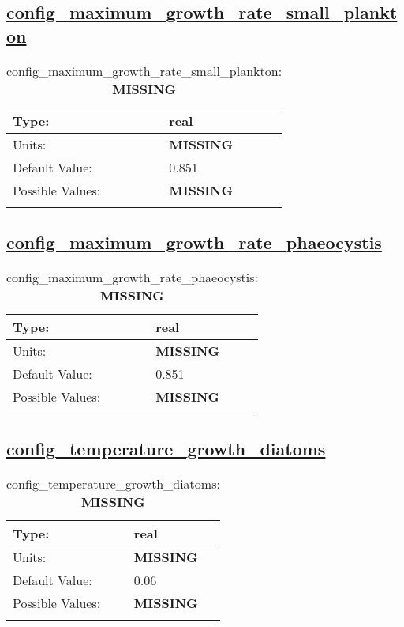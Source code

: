 \subsection[config\_maximum\_growth\_rate\_small\_plankton]{\hyperref[sec:nm_tab_biogeochemistry]{config\_maximum\_growth\_rate\_small\_plankton}}
\label{subsec:nm_sec_config_maximum_growth_rate_small_plankton}
\begin{center}
\begin{longtable}{| p{2.0in} || p{4.0in} |}
    \hline
    Type: & real \\
    \hline
    Units: & {\bf \color{red} MISSING} \\
    \hline
    Default Value: & 0.851 \\
    \hline
    Possible Values: & {\bf \color{red} MISSING} \\
    \hline
    \caption{config\_maximum\_growth\_rate\_small\_plankton: {\bf \color{red} MISSING}}
\end{longtable}
\end{center}
\subsection[config\_maximum\_growth\_rate\_phaeocystis]{\hyperref[sec:nm_tab_biogeochemistry]{config\_maximum\_growth\_rate\_phaeocystis}}
\label{subsec:nm_sec_config_maximum_growth_rate_phaeocystis}
\begin{center}
\begin{longtable}{| p{2.0in} || p{4.0in} |}
    \hline
    Type: & real \\
    \hline
    Units: & {\bf \color{red} MISSING} \\
    \hline
    Default Value: & 0.851 \\
    \hline
    Possible Values: & {\bf \color{red} MISSING} \\
    \hline
    \caption{config\_maximum\_growth\_rate\_phaeocystis: {\bf \color{red} MISSING}}
\end{longtable}
\end{center}
\subsection[config\_temperature\_growth\_diatoms]{\hyperref[sec:nm_tab_biogeochemistry]{config\_temperature\_growth\_diatoms}}
\label{subsec:nm_sec_config_temperature_growth_diatoms}
\begin{center}
\begin{longtable}{| p{2.0in} || p{4.0in} |}
    \hline
    Type: & real \\
    \hline
    Units: & {\bf \color{red} MISSING} \\
    \hline
    Default Value: & 0.06 \\
    \hline
    Possible Values: & {\bf \color{red} MISSING} \\
    \hline
    \caption{config\_temperature\_growth\_diatoms: {\bf \color{red} MISSING}}
\end{longtable}
\end{center}
